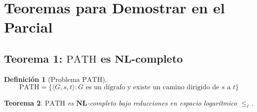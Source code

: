 \documentclass[11pt, a4paper]{article}
\theoremstyle{definition}
\newtheorem{definicion}{Definición}[section]
\theoremstyle{plain}
\newtheorem{teorema}[definicion]{Teorema}
\theoremstyle{remark}
\newcommand{\classNL}{\mathbf{NL}}
\newcommand{\PATH}{\text{PATH}}
\newcommand{\leL}{\le_\ell}
\begin{document}
\section{Teoremas para Demostrar en el Parcial}

\subsection{Teorema 1: \texorpdfstring{$\PATH$}{PATH} es \texorpdfstring{$\classNL$}{NL}-completo}

\begin{definicion}[Problema $\PATH$]
\[
\PATH = \{\langle G, s, t \rangle : G \text{ es un dígrafo y existe un camino dirigido de } s \text{ a } t\}
\]
\end{definicion}

\begin{teorema}
$\PATH$ es $\classNL$-completo bajo reducciones en espacio logarítmico $\leL$.
\end{teorema}
\end{document}

